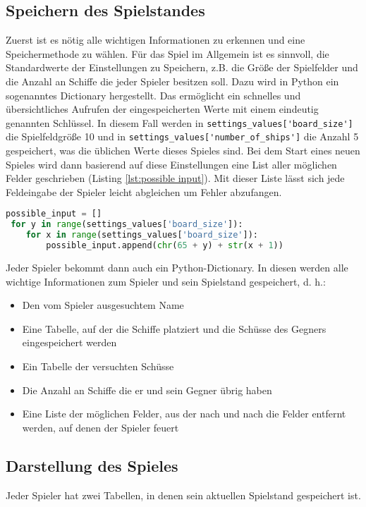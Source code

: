 \documentclass{article}
\begin{document}
\subsection{Speichern des Spielstandes}
    Zuerst ist es nötig alle wichtigen Informationen zu erkennen und eine Speichermethode zu wählen. Für das Spiel im Allgemein ist es sinnvoll, die Standardwerte der Einstellungen zu Speichern, z.B. die Größe der Spielfelder und die Anzahl an Schiffe die jeder Spieler besitzen soll. Dazu wird in Python ein sogenanntes Dictionary hergestellt. Das ermöglicht ein schnelles und übersichtliches Aufrufen der eingespeicherten Werte mit einem eindeutig genannten Schlüssel. In diesem Fall werden in \verb$settings_values['board_size']$ die Spielfeldgröße 10 und in \verb$settings_values['number_of_ships']$ die Anzahl 5 gespeichert, was die üblichen Werte dieses Spieles sind. Bei dem Start eines neuen Spieles wird dann basierend auf diese Einstellungen eine List aller möglichen Felder geschrieben (Listing \ref{lst:possible input}). Mit dieser Liste lässt sich jede Feldeingabe der Spieler leicht abgleichen um Fehler abzufangen.
\begin{lstlisting}[language=Python, caption = Herstellung einer Liste allen möglichen Felder, label=lst:possible input]
 possible_input = []
 for y in range(settings_values['board_size']):
    for x in range(settings_values['board_size']):
        possible_input.append(chr(65 + y) + str(x + 1))
\end{lstlisting}
    Jeder Spieler bekommt dann auch ein Python-Dictionary. In diesen werden alle wichtige Informationen zum Spieler und sein Spielstand gespeichert, d. h.:
\setlist{}%
\begin{itemize}
\itemsep0em
  \item Den vom Spieler ausgesuchtem Name
  \item Eine Tabelle, auf der die Schiffe platziert und die Schüsse des Gegners eingespeichert werden
  \item Ein Tabelle der versuchten Schüsse
  \item Die Anzahl an Schiffe die er und sein Gegner übrig haben
  \item Eine Liste der möglichen Felder, aus der nach und nach die Felder entfernt werden, auf denen der Spieler feuert
\end{itemize}

\subsection{Darstellung des Spieles}
    Jeder Spieler hat zwei Tabellen, in denen sein aktuellen Spielstand gespeichert ist.
\end{document}
